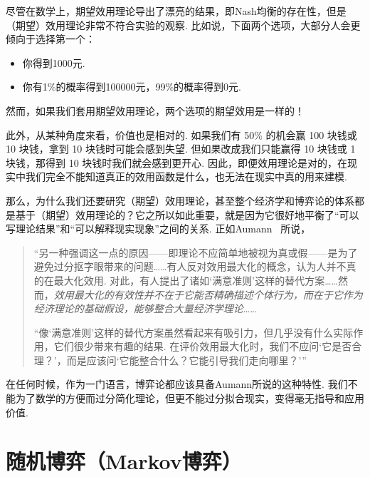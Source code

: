 尽管在数学上，期望效用理论导出了漂亮的结果，即Nash均衡的存在性，但是（期望）效用理论非常不符合实验的观察. 比如说，下面两个选项，大部分人会更倾向于选择第一个：
\begin{itemize}
    \item 你得到1000元.
    \item 你有1\%的概率得到100000元，99\%的概率得到0元.
\end{itemize}
然而，如果我们套用期望效用理论，两个选项的期望效用是一样的！

此外，从某种角度来看，价值也是相对的. 如果我们有 50\% 的机会赢 100 块钱或 10 块钱，拿到 10 块钱时可能会感到失望. 但如果改成我们只能赢得 10 块钱或 1 块钱，那得到 10 块钱时我们就会感到更开心. 因此，即便效用理论是对的，在现实中我们完全不能知道真正的效用函数是什么，也无法在现实中真的用来建模.

那么，为什么我们还要研究（期望）效用理论，甚至整个经济学和博弈论的体系都是基于（期望）效用理论的？它之所以如此重要，就是因为它很好地平衡了“可以写理论结果”和“可以解释现实现象”之间的关系. 正如Aumann~\cite{aumannWhatGameTheory1985} 所说，

\begin{quotation}
    “另一种强调这一点的原因——即理论不应简单地被视为真或假——是为了避免过分抠字眼带来的问题……有人反对效用最大化的概念，认为人并不真的在最大化效用. 对此，有人提出了诸如‘满意准则’这样的替代方案……然而，\textit{效用最大化的有效性并不在于它能否精确描述个体行为，而在于它作为经济理论的基础假设，能够整合大量经济学理论}……

    “像‘满意准则’这样的替代方案虽然看起来有吸引力，但几乎没有什么实际作用，它们很少带来有趣的结果. 在评价效用最大化时，我们不应问‘它是否合理？’，而是应该问‘它能整合什么？它能引导我们走向哪里？’”
\end{quotation}

在任何时候，作为一门语言，博弈论都应该具备Aumann所说的这种特性. 我们不能为了数学的方便而过分简化理论，但更不能过分拟合现实，变得毫无指导和应用价值.

\section{随机博弈（Markov博弈）}\label{sec:stochastic-game}

